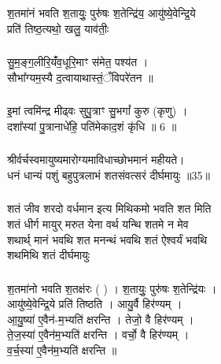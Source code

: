 \subsubsection{}
श॒तमा॑नं भवति श॒तायुः॒ पुरु॑षः श॒तेन्द्रि॑य॒ आयु॑ष्ये॒वेन्द्रि॒ये\\
प्रति॑ तिष्ठ॒त्यथो॒ खलु॒ याव॑तीः॒\\
\subsubsection{}
सु॒म॒ङ्ग॒लीरि॒यंँव॒धूरि॒माꣳ स॑मेत॒ पश्य॑त ।\\
सौभा᳚ग्यम॒स्यै द॒त्वायाथास्तं॒ँविपरे॑तन ॥\\
\subsubsection{}
इ॒मां त्वमि॑न्द्र मीढ्वः सुपु॒त्राꣳ सु॒भगां᳚ कुरु (कृणु) ।\\
दशा᳚स्यां पु॒त्रानाधे॑हि॒ पति॑मेकाद॒शं कृ॑धि ॥ 6 ॥\\
\subsubsection{}
श्रीर्वर्चस्वमायुष्यमारोग्यमाविधाच्छोभमानं महीयते।\\
धनं धान्यं पशुं बहुपुत्रलाभं शतसंवत्सरं दीर्घमायुः ॥35॥\\
\subsubsection{}
शतं जीव शरदो वर्धमान इत्य मिथिकमो भवति शत मिति \\
शतं धीर्ग मायुर् मरुत येना वर्थ यन्थि शतमे न मेव \\
शथार्थ् मानं भवथि शत मनन्थं भवथि शतं ऐश्वर्यं भवथि \\
शथमिथि शतं दीर्घमायुः\\
\subsubsection{}
श॒तमा॑नो भवति श॒तक्ष॑रः ( ) । श॒तायुः॒ पुरु॑षः श॒तेन्द्रि॑यः ।\\
आयु॑ष्ये॒वेन्द्रि॒ये प्रति॑ तिष्ठति । आयु॒र्वै हिर॑ण्यम् ।\\
आ॒यु॒ष्या॑ ए॒वैन॑-म॒भ्यति॑ क्षरन्ति । तेजो॒ वै हिर॑ण्यम् ।\\
ते॒ज॒स्या॑ ए॒वैन॑म॒भ्यति॑ क्षरन्ति । वर्चो॒ वै हिर॑ण्यम् ।\\
व॒र्च॒स्या॑ ए॒वैन॑म॒भ्यति॑ क्षरन्ति ॥\\
